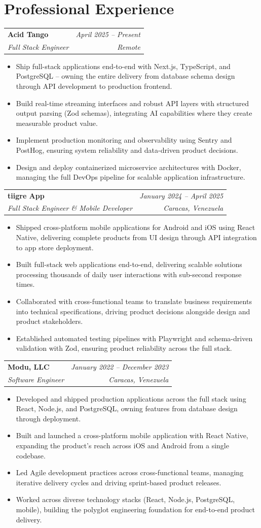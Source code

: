 \documentclass[letterpaper,11pt]{article}
\makeatletter
\newcommand{\resumeSubheading}[4]{
    \vspace{2pt}
    \begin{tabular*}{\textwidth}[t]{l@{\extracolsep{\fill}}r}
        \textbf{#1} & \textit{\small #2} \\
        \textit{\small #3} & \textit{\small #4} \\
    \end{tabular*}\vspace{-5pt}
}
\newcommand{\resumeItem}[1]{\item\small{#1}\vspace{-2pt}}
\newcommand{\resumeItemListStart}{\begin{itemize}[leftmargin=0.2in]}
\newcommand{\resumeItemListEnd}{\end{itemize}\vspace{-4pt}}
\makeatother
\begin{document}
\section{Professional Experience}

\resumeSubheading
    {Acid Tango}{April 2025 -- Present}
    {Full Stack Engineer}{Remote}
\resumeItemListStart
    \resumeItem{Ship full-stack applications end-to-end with Next.js, TypeScript, and PostgreSQL -- owning the entire delivery from database schema design through API development to production frontend.}
    \resumeItem{Build real-time streaming interfaces and robust API layers with structured output parsing (Zod schemas), integrating AI capabilities where they create measurable product value.}
    \resumeItem{Implement production monitoring and observability using Sentry and PostHog, ensuring system reliability and data-driven product decisions.}
    \resumeItem{Design and deploy containerized microservice architectures with Docker, managing the full DevOps pipeline for scalable application infrastructure.}
\resumeItemListEnd

\resumeSubheading
    {tiigre App}{January 2024 -- April 2025}
    {Full Stack Engineer \& Mobile Developer}{Caracas, Venezuela}
\resumeItemListStart
    \resumeItem{Shipped cross-platform mobile applications for Android and iOS using React Native, delivering complete products from UI design through API integration to app store deployment.}
    \resumeItem{Built full-stack web applications end-to-end, delivering scalable solutions processing thousands of daily user interactions with sub-second response times.}
    \resumeItem{Collaborated with cross-functional teams to translate business requirements into technical specifications, driving product decisions alongside design and product stakeholders.}
    \resumeItem{Established automated testing pipelines with Playwright and schema-driven validation with Zod, ensuring product reliability across the full stack.}
\resumeItemListEnd

\resumeSubheading
    {Modu, LLC}{January 2022 -- December 2023}
    {Software Engineer}{Caracas, Venezuela}
\resumeItemListStart
    \resumeItem{Developed and shipped production applications across the full stack using React, Node.js, and PostgreSQL, owning features from database design through deployment.}
    \resumeItem{Built and launched a cross-platform mobile application with React Native, expanding the product's reach across iOS and Android from a single codebase.}
    \resumeItem{Led Agile development practices across cross-functional teams, managing iterative delivery cycles and driving sprint-based product releases.}
    \resumeItem{Worked across diverse technology stacks (React, Node.js, PostgreSQL, mobile), building the polyglot engineering foundation for end-to-end product delivery.}
\resumeItemListEnd
\end{document}
